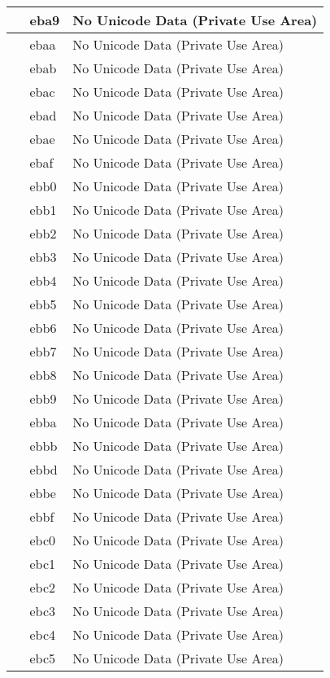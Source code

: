 \documentclass[12pt,letterpaper,openany]{book}
\begin{document}
\begin{center}
\begin{supertabular}{|m{0.25in}|m{0.5in}|m{4in}|}
 & eba9 & No Unicode Data (Private Use Area)\\\hline
 & ebaa & No Unicode Data (Private Use Area)\\\hline
 & ebab & No Unicode Data (Private Use Area)\\\hline
 & ebac & No Unicode Data (Private Use Area)\\\hline
 & ebad & No Unicode Data (Private Use Area)\\\hline
 & ebae & No Unicode Data (Private Use Area)\\\hline
 & ebaf & No Unicode Data (Private Use Area)\\\hline
 & ebb0 & No Unicode Data (Private Use Area)\\\hline
 & ebb1 & No Unicode Data (Private Use Area)\\\hline
 & ebb2 & No Unicode Data (Private Use Area)\\\hline
 & ebb3 & No Unicode Data (Private Use Area)\\\hline
 & ebb4 & No Unicode Data (Private Use Area)\\\hline
 & ebb5 & No Unicode Data (Private Use Area)\\\hline
 & ebb6 & No Unicode Data (Private Use Area)\\\hline
 & ebb7 & No Unicode Data (Private Use Area)\\\hline
 & ebb8 & No Unicode Data (Private Use Area)\\\hline
 & ebb9 & No Unicode Data (Private Use Area)\\\hline
 & ebba & No Unicode Data (Private Use Area)\\\hline
 & ebbb & No Unicode Data (Private Use Area)\\\hline
 & ebbd & No Unicode Data (Private Use Area)\\\hline
 & ebbe & No Unicode Data (Private Use Area)\\\hline
 & ebbf & No Unicode Data (Private Use Area)\\\hline
 & ebc0 & No Unicode Data (Private Use Area)\\\hline
 & ebc1 & No Unicode Data (Private Use Area)\\\hline
 & ebc2 & No Unicode Data (Private Use Area)\\\hline
 & ebc3 & No Unicode Data (Private Use Area)\\\hline
 & ebc4 & No Unicode Data (Private Use Area)\\\hline
 & ebc5 & No Unicode Data (Private Use Area)\\\hline

\end{supertabular}
\end{center}
\end{document}
